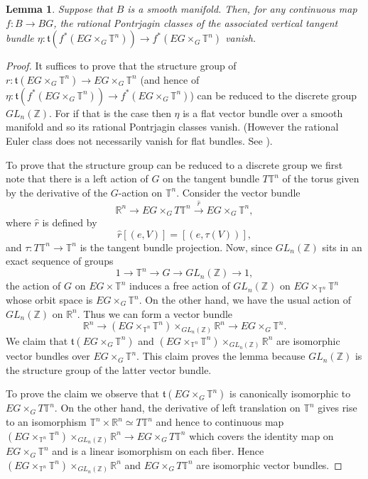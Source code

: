 \documentclass[onecolumn,notitlepage,11pt]{article}
\newcommand{\Z}{\mathbb{Z}}
\newcommand{\R}{\mathbb{R}}
\newcommand{\T}{\mathbb{T}}
\newcommand{\beq}{\begin{equation*}}
\newcommand{\eeq}{\end{equation*}}
\newtheorem{lemma}{Lemma}[section]
\theoremstyle{definition}
\begin{document}
\begin{lemma}\label{discrete}
Suppose that $B$ is a smooth manifold.
Then, for any continuous map $f:B\to BG$, the rational Pontrjagin
classes of the associated vertical tangent bundle
$\eta:\mathfrak{t}(f^*(EG\times_G\T^n))\to f^*(EG\times_G\T^n)$ vanish.
\end{lemma}
\begin{proof}
It suffices to prove that the structure group of 
$r:\mathfrak{t}(EG\times_G\T^n)\to EG\times_G\T^n$ (and hence
of $\eta:\mathfrak{t}(f^*(EG\times_G\T^n))\to f^*(EG\times_G\T^n)$) can be reduced
to the discrete group $GL_n(\Z)$. For if that is the case then 
$\eta$
is a flat vector bundle over a smooth manifold and so its 
rational Pontrjagin classes vanish. (However the rational Euler
class does not necessarily vanish for flat bundles. See 
\cite[Appendix C, p. 308, 312]{milnor}).

To prove that the structure group can be reduced to a discrete
group we first note that
there is a left action of $G$ on the tangent bundle $T\T^n$ of the torus
given by the derivative of the $G$-action on $\T^n$. Consider the vector bundle
\beq
\R^n\to EG\times_G T\T^n\xrightarrow{\hat{r}}EG\times_G\T^n,
\eeq
where $\hat{r}$ is defined by
\beq
\hat{r}[(e,V)]=[(e,\tau(V))],
\eeq
and $\tau:T\T^n\to \T^n$ is the tangent bundle projection. Now, since
$GL_n(\Z)$ sits in an exact sequence of groups
\beq
1\to \T^n\to G\to GL_n(\Z)\to 1,
\eeq
the action of $G$ on $EG\times\T^n$ induces a free action of $GL_n(\Z)$ on
$EG\times_{\T^n}\T^n$ whose orbit space is $EG\times_G\T^n$. On the other
hand, we have the usual action of $GL_n(\Z)$ on $\R^n$. Thus we can form
a vector bundle
\beq
\R^n\to (EG\times_{\T^n}\T^n)\times_{GL_n(\Z)}\R^n\to EG\times_G\T^n.
\eeq
We claim that $\mathfrak{t}(EG\times_G\T^n)$ and $(EG\times_{\T^n}\T^n)\times_{GL_n(\Z)}\R^n$ are isomorphic vector bundles
over $EG\times_G\T^n$. This claim proves the lemma because
$GL_n(\Z)$ is the structure group of the latter vector bundle.

To prove the claim we observe that $\mathfrak{t}(EG\times_G\T^n)$ 
is canonically
isomorphic to $EG\times_{G}T\T^n$. On the other hand,
the derivative of left 
translation on $\T^n$ gives rise to an isomorphism 
$\T^n\times\R^n\simeq T\T^n$ and hence to continuous map
$(EG\times_{\T^n}\T^n)\times_{GL_n(\Z)}\R^n\to EG\times_{G}T\T^n$ which
covers the identity map on $EG\times_G\T^n$ and is a linear isomorphism
on each fiber. Hence $(EG\times_{\T^n}\T^n)\times_{GL_n(\Z)}\R^n$ and
$EG\times_{G}T\T^n$ are isomorphic vector bundles.
\end{proof}
\end{document}
